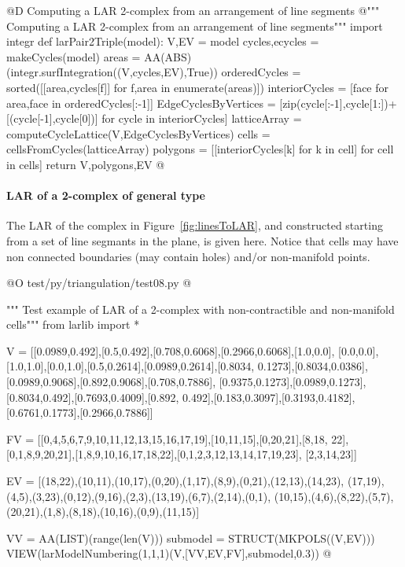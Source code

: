 \documentclass[11pt,oneside]{article}    %
\begin{document}
@D Computing a LAR 2-complex from an arrangement of line segments
@{""" Computing a LAR 2-complex from an arrangement of line segments"""
import integr
def larPair2Triple(model):
    V,EV = model
    cycles,ecycles = makeCycles(model)
    areas = AA(ABS)(integr.surfIntegration((V,cycles,EV),True))
    orderedCycles = sorted([[area,cycles[f]] for f,area in enumerate(areas)])
    interiorCycles = [face for area,face in orderedCycles[:-1]]
    EdgeCyclesByVertices = [zip(cycle[:-1],cycle[1:])+[(cycle[-1],cycle[0])] 
                                for cycle in interiorCycles]
    latticeArray = computeCycleLattice(V,EdgeCyclesByVertices)
    cells = cellsFromCycles(latticeArray)
    polygons = [[interiorCycles[k] for k in cell] for cell in cells]
    return V,polygons,EV
@}



\paragraph{LAR of a 2-complex of general type}

The LAR of the complex in Figure~\ref{fig:linesToLAR}, and constructed starting from a set of line segmants in the plane, is given here. Notice that cells may have non connected boundaries (may contain holes) and/or non-manifold points.

@O test/py/triangulation/test08.py
@{""" Test example of LAR of a 2-complex with non-contractible and non-manifold cells"""
from larlib import *

V = [[0.0989,0.492],[0.5,0.492],[0.708,0.6068],[0.2966,0.6068],[1.0,0.0], 
[0.0,0.0],[1.0,1.0],[0.0,1.0],[0.5,0.2614],[0.0989,0.2614],[0.8034,
0.1273],[0.8034,0.0386],[0.0989,0.9068],[0.892,0.9068],[0.708,0.7886],
[0.9375,0.1273],[0.0989,0.1273],[0.8034,0.492],[0.7693,0.4009],[0.892,
0.492],[0.183,0.3097],[0.3193,0.4182],[0.6761,0.1773],[0.2966,0.7886]]

FV = [[0,4,5,6,7,9,10,11,12,13,15,16,17,19],[10,11,15],[0,20,21],[8,18,
22], [0,1,8,9,20,21],[1,8,9,10,16,17,18,22],[0,1,2,3,12,13,14,17,19,23],
[2,3,14,23]]

EV = [(18,22),(10,11),(10,17),(0,20),(1,17),(8,9),(0,21),(12,13),(14,23), 
(17,19),(4,5),(3,23),(0,12),(9,16),(2,3),(13,19),(6,7),(2,14),(0,1),
(10,15),(4,6),(8,22),(5,7),(20,21),(1,8),(8,18),(10,16),(0,9),(11,15)]

VV = AA(LIST)(range(len(V)))
submodel = STRUCT(MKPOLS((V,EV)))        
VIEW(larModelNumbering(1,1,1)(V,[VV,EV,FV],submodel,0.3)) 
@}
\end{document}
